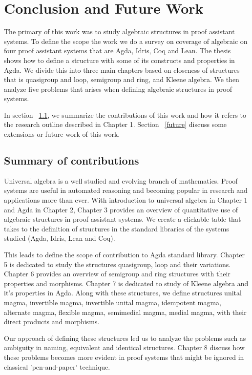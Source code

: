 \chapter{Conclusion and Future Work}
The primary of this work was to study algebraic structures in proof assistant
systems. To define the scope the work we do a survey on coverage of algebraic on
four proof assistant systems that are Agda, Idris, Coq and Lean. The thesis
shows how to define a structure with some of its constructs and properties in
Agda. We divide this into three main chapters based on closeness of structures
that is quasigroup and loop, semigroup and ring, and Kleene algebra. We then
analyze five problems that arises when defining algebraic structures in proof
systems.

In section ~\ref{contribution}, we summarize the contributions of this work and
how it refers to the research outline described in Chapter 1. Section
~\ref{future} discuss some extensions or future work of this work. 

\section{Summary of contributions}
\label{contribution}
Universal algebra is a well studied and evolving branch of mathematics. Proof
systems are useful in automated reasoning and becoming popular in research and
applications more than ever. With introduction to universal algebra in Chapter 1
and Agda in Chapter 2, Chapter 3 provides an overview of quantitative use of
algebraic structures in proof assistant systems. We create a clickable table
that takes to the definition of structures in the standard libraries of the
systems studied (Agda, Idris, Lean and Coq).

This leads to define the scope of contribution to Agda standard library. Chapter
5 is dedicated to study the structures quasigroup, loop and their variations.
Chapter 6 provides an overview of semigroup and ring structures with their
properties and morphisms. Chapter 7 is dedicated to study of Kleene algebra and
it's properties in Agda. Along with these structures, we define structures
unital magma, invertible magma, invertible unital magma, idempotent magma,
alternate magma, flexible magma, semimedial magma, medial magma, with their
direct products and morphisms.

Our approach of defining these structures led us to analyze the problems such as
ambiguity in naming, equivalent and identical structures. Chapter 8 discuss how
these problems becomes more evident in proof systems that might be ignored in
classical 'pen-and-paper' technique.


